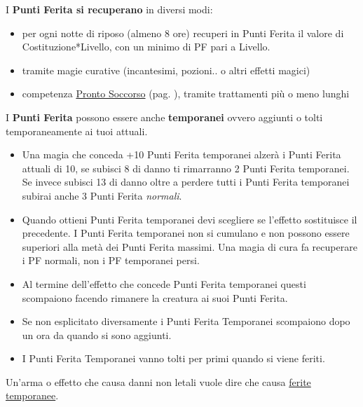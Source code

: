 \medskip

I \textbf{Punti Ferita si recuperano} in diversi modi:\label{recuperarepf}

\begin{itemize}[leftmargin=*] \setlength{\itemsep}{0pt}

\item per ogni notte di riposo (almeno 8 ore) recuperi in Punti Ferita il valore di Costituzione*Livello, con un minimo di PF pari a Livello. 

\item tramite magie curative (incantesimi, pozioni.. o altri effetti magici)

\item competenza \hyperlink{prontosoccorso}{Pronto Soccorso} (pag. \pageref{prontosoccorso}), tramite trattamenti più o meno lunghi

\end{itemize}

I \textbf{Punti Ferita} possono essere anche \textbf{temporanei} ovvero aggiunti o tolti temporaneamente ai tuoi attuali.

\noindent\begin{itemize}[leftmargin=*] \setlength{\itemsep}{0pt}

\item Una magia che conceda +10 Punti Ferita temporanei alzerà i Punti Ferita attuali di 10, se subisci 8 di danno ti rimarranno 2 Punti Ferita temporanei. Se invece subisci 13 di danno oltre a perdere tutti i Punti Ferita temporanei subirai anche 3 Punti Ferita \emph{normali}.

\item Quando ottieni Punti Ferita temporanei devi scegliere se l'effetto sostituisce il precedente. I Punti Ferita temporanei non si cumulano e non possono essere superiori alla metà dei Punti Ferita massimi. Una magia di cura fa recuperare i PF normali, non i PF temporanei persi.

\item Al termine dell'effetto che concede Punti Ferita temporanei questi scompaiono facendo rimanere la creatura ai suoi Punti Ferita.

\item Se non esplicitato diversamente i Punti Ferita Temporanei scompaiono dopo un ora da quando si sono aggiunti.

\item I Punti Ferita Temporanei vanno tolti per primi quando si viene feriti.

\end{itemize}

Un'arma o effetto che causa danni non letali vuole dire che causa \hyperlink{recuperopuntiferitanonletali}{ferite temporanee}\label{feritetemporanee}.


